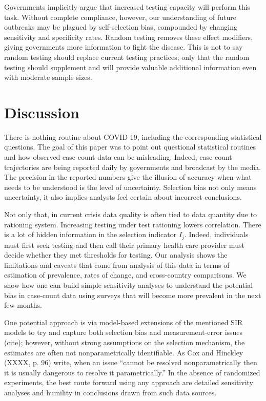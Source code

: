 \documentclass[aoas]{amsart}
\begin{document}
Governments implicitly argue that increased testing capacity will perform this task.  Without complete compliance, however, our understanding of future outbreaks may be plagued by self-selection bias, compounded by changing sensitivity and specificity rates.  Random testing removes these effect modifiers, giving governments more information to fight the disease.  This is not to say random testing should replace current testing practices; only that the random testing should supplement and will provide valuable additional information even with moderate sample sizes.

\section{Discussion}

There is nothing routine about COVID-19, including the corresponding statistical questions.  The goal of this paper was to point out questional statistical routines and how observed case-count data can be misleading.  Indeed, case-count trajectories are being reported daily by governments and broadcast by the media.  The precision in the reported numbers give the illusion of accuracy when what needs to be understood is the level of uncertainty. Selection bias not only means uncertainty, it also implies analysts feel certain about incorrect conclusions.

Not only that, in current crisis data quality is often tied to data quantity due to rationing system.  Increasing testing under test rationing lowers correlation.  There is a lot of hidden information in the selection indicator $I_j$.  Indeed, individuals must first seek testing and then call their primary health care provider must decide whether they met thresholds for testing.  Our analysis shows the limitations and caveats that come from analysis of this data in terms of estimation of prevalence, rates of change, and cross-country comparisons.  We show how one can build simple sensitivity analyses to understand the potential bias in case-count data using surveys that will become more prevalent in the next few months.

One potential approach is via model-based extensions of the mentioned SIR models to try and capture both selection bias and measurement-error issues (cite); however, without strong assumptions on the selection mechanism, the estimates are often not nonparametrically identifiable.  As Cox and Hinckley (XXXX, p. 96) write, when an issue ``cannot be resolved nonparametrically then it is usually dangerous to resolve it parametrically.'' In the absence of randomized experiments, the best route forward using any approach are detailed sensitivity analyses and humility in conclusions drawn from such data sources.
\end{document}

